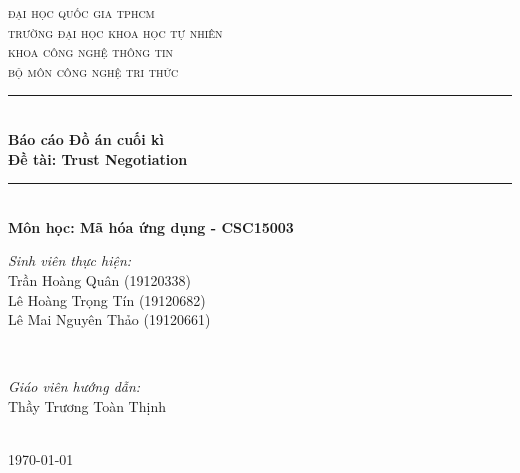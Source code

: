 \documentclass[12pt]{article}
\newcommand{\coursename}{Mã hóa ứng dụng - CSC15003}
\newcommand{\reportname}{Trust Negotiation}
\begin{document}
\begin{titlepage}
\newcommand{\HRule}{\rule{\linewidth}{0.5mm}}
\centering

\textsc{\LARGE đại học quốc gia tphcm}\\[1.5cm]
\textsc{\Large trường đại học khoa học tự nhiên}\\[0.5cm]
\textsc{\large khoa công nghệ thông tin}\\[0.5cm]
\textsc{bộ môn công nghệ tri thức}\\[0.5cm]

\HRule \\[0.4cm]
{ 
\huge{\bfseries{Báo cáo Đồ án cuối kì}}\\[0.5cm]
\large{\bfseries{Đề tài: \reportname}}
}\\[0.4cm]
\HRule \\[0.5cm]

\textbf{\large Môn học: \coursename}\\[0.5cm]

\begin{minipage}[t]{0.4\textwidth}
\begin{flushleft} \large
\emph{Sinh viên thực hiện:}\\
Trần Hoàng Quân \textsc{(19120338)}\\
Lê Hoàng Trọng Tín \textsc{(19120682)}\\
Lê Mai Nguyên Thảo \textsc{(19120661)}
\end{flushleft}
\end{minipage}
~
\begin{minipage}[t]{0.4\textwidth}
\begin{flushright} \large
\emph{Giáo viên hướng dẫn:} \\
Thầy Trương Toàn Thịnh
\end{flushright}
\end{minipage}\\[2cm]

{\large \today}\\[2cm]


\end{titlepage}
\end{document}

